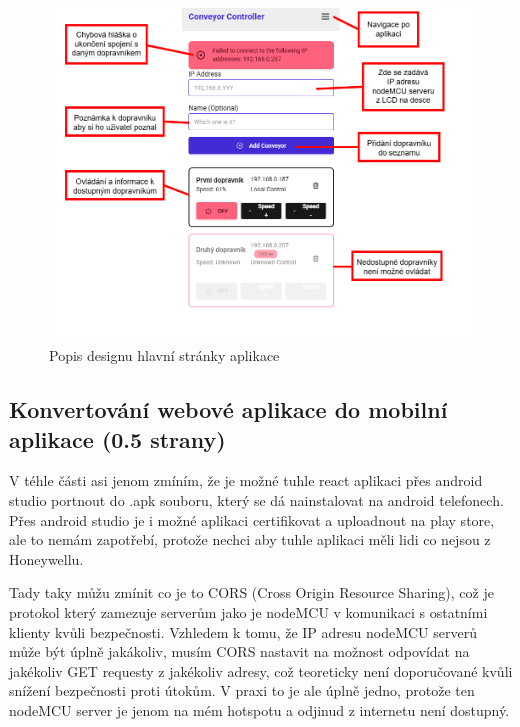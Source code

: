 \begin{figure}[H]
    \centering
    \includegraphics[width=0.9\linewidth]{images/LandingPage_Annot.png}
    \caption{Popis designu hlavní stránky aplikace}
    \label{fig:LandingPageAnnotated}
\end{figure}

\subsection{Konvertování webové aplikace do mobilní aplikace (0.5 strany)}\label{sec:KonvertovaniWeboveAplikaceDoMobilni}


V téhle části asi jenom zmíním, že je možné tuhle react aplikaci přes android studio portnout do .apk souboru, který se dá nainstalovat na android telefonech. Přes android studio je i možné aplikaci certifikovat a uploadnout na play store, ale to nemám zapotřebí, protože nechci aby tuhle aplikaci měli lidi co nejsou z Honeywellu.

Tady taky můžu zmínit co je to CORS (Cross Origin Resource Sharing), což je protokol který zamezuje serverům jako je nodeMCU v komunikaci s ostatními klienty kvůli bezpečnosti. Vzhledem k tomu, že IP adresu nodeMCU serverů může být úplně jakákoliv, musím CORS nastavit na možnost odpovídat na jakékoliv GET requesty z jakékoliv adresy, což teoreticky není doporučované kvůli snížení bezpečnosti proti útokům. V praxi to je ale úplně jedno, protože ten nodeMCU server je jenom na mém hotspotu a odjinud z internetu není dostupný.

